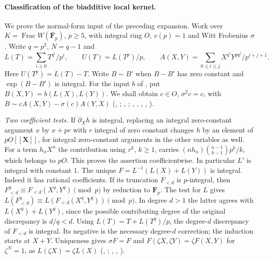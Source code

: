 \paragraph{Classification of the biadditive local kernel.}\label{sec:P-r4-z41-kernel}
We prove the normal-form input  of the preceding
expansion. Work over $K=\operatorname{Frac}W(\overline{\mathbf F}_p)$,
$p\ge5$, with integral ring $O$, $v(p)=1$ and Witt Frobenius $\sigma$.
Write $q=p^2$, $N=q-1$ and
\[
 L(T)=\sum_{i\ge0}T^{q^i}/p^i,\qquad
 U(T)=L(T^p)/p,\qquad
 A(X,Y)=\sum_{0\le i\le j}
      X^{q^i}Y^{p q^j}/p^{i+j+1}.
\]
Here $U(T^p)=L(T)-T$. Write $B\sim B'$ when $B-B'$ has zero constant
and $\exp(B-B')$ is integral. For the input $b$ of , put
$B(X,Y)=b(L(X),L(Y))$. We shall obtain $c\in O$, $\sigma^2c=c$,
with $B\sim cA(X,Y)-\sigma(c)A(Y,X)$
(, ;
, ;
, , , ,
).

\emph{Two coefficient tests.} If $\partial_X h$ is integral, replacing
an integral zero-constant argument $x$ by $x+p r$ with $r$ integral of
zero constant changes $h$ by an element of $pO[[\mathbf X]]$, for
integral zero-constant arguments in the other variables as well.
For a term $h_n X^n$ the contribution using $r^k$, $k\ge1$, carries
$(nh_n)\binom{n-1}{k-1}p^k/k$, which belongs to $pO$. This proves
the assertion coefficientwise. In particular $L'$ is integral with
constant $1$. The unique $F=L^{-1}(L(X)+L(Y))$ is integral. Indeed it
has rational coefficients. If its truncation $F_{<d}$ is $p$-integral,
then $F_{<d}^q\equiv F_{<d}(X^q,Y^q)\pmod p$ by reduction to
$\mathbf F_p$. The test for $L$ gives
$L(F_{<d}^q)\equiv L(F_{<d}(X^q,Y^q))\pmod p$.
In degree $d>1$ the latter agrees with $L(X^q)+L(Y^q)$, since the
possible contributing degree of the original discrepancy is $d/q<d$.
Using $L(T)=T+L(T^q)/p$, the degree-$d$ discrepancy of $F_{<d}$
is integral. Its negative is the necessary degree-$d$ correction;
the induction starts at $X+Y$. Uniqueness gives $\sigma F=F$ and
$F(\zeta X,\zeta Y)=\zeta F(X,Y)$ for $\zeta^N=1$, as
$L(\zeta X)=\zeta L(X)$ (,
; ,
, ).

